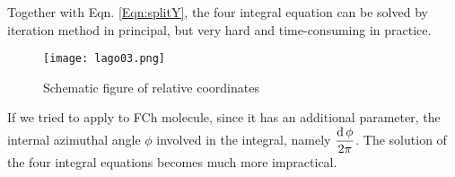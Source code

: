 Together with Eqn. \ref{Eqn:splitY}, the four integral equation can be solved by iteration method in principal, but very hard and time-consuming in practice.
\begin{figure}[H]
 	\centering
 	\texttt{[image: lago03.png]} \\
	\caption[Schematic of coordinates]{Schematic figure of relative coordinates\cite{Liang2019PRE}}
	\label{fig:lago}
\end{figure}

If we tried to apply to FCh molecule,  since it has an additional parameter, the internal azimuthal angle $\phi$ involved in the integral, namely $\dfrac{\operatorname{d}\phi}{2\pi}$. The solution of the four integral equations becomes much more impractical.


